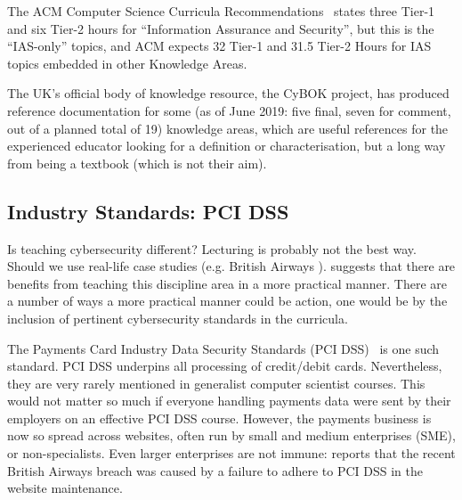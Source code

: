 \documentclass[conference]{IEEEtran}
\begin{document}
The ACM Computer Science Curricula Recommendations~\cite{ACM2013a} states three Tier-1 and six Tier-2 hours for ``Information Assurance and Security'', but this is the ``IAS-only'' topics, and ACM expects 32 Tier-1 and 31.5 Tier-2 Hours for IAS topics embedded in other Knowledge Areas.

The UK's official body of knowledge resource, the CyBOK project\cite{Bristol2019a}, has produced reference documentation for some (as of June 2019: five final, seven for comment, out of a planned total of 19)   %
knowledge areas, which are useful references for the experienced educator looking for a definition or characterisation, but a long way from being a textbook (which is not their aim).


\subsection{Industry Standards: PCI DSS}\label{sec:PCIDSS}

Is teaching cybersecurity different? Lecturing is probably not the best way. Should we use real-life case studies (e.g. British Airways \cite{Barth2018a}). \cite{Weiss:2013:THC:2527148.2527180} suggests that there are benefits from teaching this discipline area in a more practical manner.  There are a number of ways a more practical manner could be action, one would be by the inclusion of pertinent cybersecurity standards in the curricula.

The Payments Card Industry Data Security Standards (PCI DSS)~\cite{PCI2018b} is one such standard. PCI DSS underpins all processing of credit/debit cards. Nevertheless, they are very rarely mentioned in generalist computer scientist courses. This would not matter so much if everyone handling payments data were sent by their employers on an effective PCI DSS course. However, the payments business is now so spread across websites, often run by small and medium enterprises (SME), or non-specialists.  Even larger enterprises are not immune: \cite{Barth2018a} reports that the recent British Airways breach was caused by a failure to adhere to PCI DSS in the website maintenance. 
\end{document}
